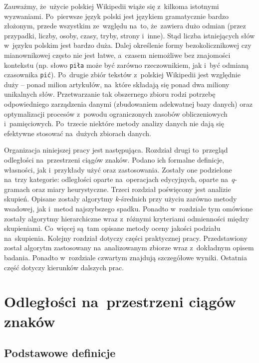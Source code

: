\documentclass{praca1}
\begin{document}
Zauważmy, że~użycie polskiej Wikipedii wiąże się z~kilkoma istotnymi wyzwaniami. Po~pierwsze język polski jest językiem gramatycznie bardzo złożonym, przede wszystkim ze~względu na~to, że~zawiera dużo odmian (przez przypadki, liczby, osoby, czasy, tryby, strony i~inne). Stąd liczba istniejących słów w~języku polskim jest bardzo duża. Dalej określenie formy bezokolicznikowej czy mianownikowej często nie jest łatwe, a~czasem niemożliwe bez znajomości kontekstu (np. słowo \verb|piła| może być zarówno rzeczownikiem, jak i~być odmianą czasownika \verb|pić|). Po~drugie zbiór tekstów z~polskiej Wikipedii jest względnie duży -- ponad milion artykułów,  na~które składają się ponad dwa miliony unikalnych słów. Przetwarzanie tak obszernego zbioru rodzi potrzebę odpowiedniego zarządzenia danymi (zbudowaniem adekwatnej bazy danych) oraz optymalizacji procesów z~powodu ograniczonych zasobów obliczeniowych i~pamięciowych. Po~trzecie niektóre metody analizy danych nie dają się efektywne stosować na~dużych zbiorach danych. 


Organizacja niniejszej pracy jest następująca. Rozdział drugi to~przegląd odległości na~przestrzeni ciągów znaków.  Podano ich formalne definicje, własności, jak i~przykłady użyć oraz zastosowania. Zostały one podzielone na~trzy kategorie: odległości oparte na~operacjach edycyjnych, oparte na~$q$-gramach oraz miary heurystyczne. Trzeci rozdział poświęcony jest analizie skupień. Opisane zostały algorytmy $k$-średnich przy użyciu zarówno metody wsadowej, jak i~metod najszybszego spadku. Ponadto w~rozdziale tym omówione zostały algorytmy hierarchiczne wraz z~różnymi kryteriami odmienności między skupieniami. Co~więcej są~tam opisane metody oceny jakości podziału na~skupienia. Kolejny rozdział dotyczy części praktycznej pracy. Przedstawiony został algorytm zastosowany na~analizowanym zbiorze wraz z~dokładnym opisem badania. Ponadto w~rozdziale czwartym znajdują szczegółowe wyniki. Ostatnia część dotyczy kierunków dalszych prac.




\chapter{Odległości na~przestrzeni ciągów znaków}
\label{metryki-na-przestrzeni-ciagow-znakow}


\section{Podstawowe definicje}
\end{document}
